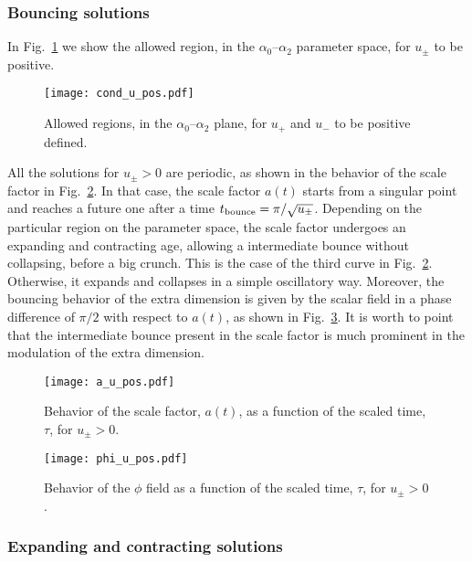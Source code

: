 \documentclass[aps,prd,12pt,superscriptaddress,showpacs,showkeys,longbibliography,reprint,nofootinbib]{revtex4-1}
\begin{document}
\subsubsection{Bouncing solutions}

In Fig.~\ref{cond_u_pos} we show the allowed region, in the $\alpha_0$--$\alpha_2$ parameter space, for $u_\pm$ to be positive. 
\begin{figure}[H]
  \texttt{[image: cond\_u\_pos.pdf]}
  \caption{Allowed regions, in the $\alpha_0$--$\alpha_2$ plane, for $u_+$ and $u_-$ to be positive defined.}
  \label{cond_u_pos}
\end{figure}

All the solutions for $u_\pm>0$ are periodic, as shown in the behavior of the scale factor in Fig.~\ref{a_u_pos}. In that case, the scale factor $a(t)$ starts from a singular point and reaches a future one after a time $t_{\rm bounce}=\pi/\sqrt{u_\pm}$. Depending on the particular region on the parameter space, the scale factor undergoes an expanding and contracting age, allowing a intermediate bounce without collapsing, before a big crunch. This is the case of the third curve in Fig.~\ref{a_u_pos}. Otherwise, it expands and collapses in a {simple} oscillatory way.
Moreover, the bouncing behavior of the extra dimension is given by the scalar field in a phase difference of $\pi/2$ with respect to $a(t)$, as shown in Fig.~\ref{phi_u_pos}. It is worth to point that the {intermediate bounce} present in the scale factor is much prominent in the modulation of the extra dimension.
\begin{figure}[H]
  \texttt{[image: a\_u\_pos.pdf]}
  \caption{Behavior of the scale factor, \(a(t)\), as a function of the scaled time, $\tau$, for $u_\pm > 0$.}
  \label{a_u_pos}
\end{figure}
\begin{figure}[H]
  \texttt{[image: phi\_u\_pos.pdf]}
  \caption{Behavior of the $\phi$ field as a function of the scaled time, $\tau$, for $u_\pm > 0$.}
  \label{phi_u_pos}
\end{figure}

\subsubsection{Expanding and contracting solutions}
\end{document}
